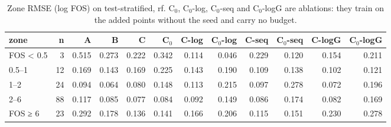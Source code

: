\begin{table}[htbp]
\centering
\small
\setlength{\tabcolsep}{4pt}
\caption{Zone RMSE (log FOS) on test-stratified, rf. C$_0$, C$_0$-log, C$_0$-seq and C$_0$-logG are ablations: they train on the added points without the seed and carry no budget.}
\label{tab:test-stratified__log-rmse:zones_log:rf}
\begin{tabular}{lrrrrrrrrrrr}
\toprule
zone & n & A & B & C & C$_0$ & C-log & C$_0$-log & C-seq & C$_0$-seq & C-logG & C$_0$-logG \\
\midrule
FOS < 0.5 & 3 & 0.515 & 0.273 & 0.222 & 0.342 & 0.114 & 0.046 & 0.229 & 0.120 & 0.154 & 0.211 \\
0.5–1 & 12 & 0.169 & 0.143 & 0.169 & 0.225 & 0.143 & 0.190 & 0.109 & 0.138 & 0.102 & 0.121 \\
1–2 & 24 & 0.094 & 0.064 & 0.080 & 0.148 & 0.113 & 0.215 & 0.097 & 0.278 & 0.072 & 0.196 \\
2–6 & 88 & 0.117 & 0.085 & 0.077 & 0.084 & 0.092 & 0.149 & 0.086 & 0.174 & 0.082 & 0.169 \\
FOS ≥ 6 & 23 & 0.292 & 0.178 & 0.136 & 0.141 & 0.166 & 0.206 & 0.115 & 0.151 & 0.230 & 0.278 \\
\bottomrule
\end{tabular}
\end{table}
